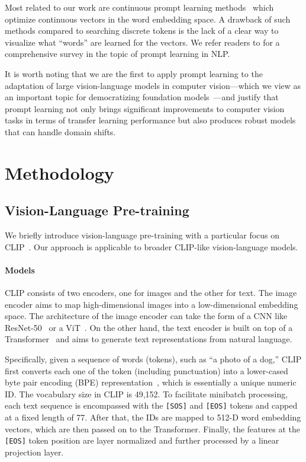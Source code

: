 Most related to our work are continuous prompt learning methods~\citep{zhong2021factual,li2021prefix,lester2021power} which optimize continuous vectors in the word embedding space. A drawback of such methods compared to searching discrete tokens is the lack of a clear way to visualize what ``words'' are learned for the vectors. We refer readers to \citet{liu2021pre} for a comprehensive survey in the topic of prompt learning in NLP.

It is worth noting that we are the first to apply prompt learning to the adaptation of large vision-language models in computer vision---which we view as an important topic for democratizing foundation models~\citep{bommasani2021opportunities}---and justify that prompt learning not only brings significant improvements to computer vision tasks in terms of transfer learning performance but also produces robust models that can handle domain shifts.


\section{Methodology} \label{sec:method}

\subsection{Vision-Language Pre-training}
We briefly introduce vision-language pre-training with a particular focus on CLIP~\citep{radford2021learning}. Our approach is applicable to broader CLIP-like vision-language models.

\paragraph{Models}
CLIP consists of two encoders, one for images and the other for text. The image encoder aims to map high-dimensional images into a low-dimensional embedding space. The architecture of the image encoder can take the form of a CNN like ResNet-50~\citep{he2016deep} or a ViT~\citep{dosovitskiy2021image}. On the other hand, the text encoder is built on top of a Transformer~\citep{vaswani2017attention} and aims to generate text representations from natural language.

Specifically, given a sequence of words (tokens), such as ``a photo of a dog,'' CLIP first converts each one of the token (including punctuation) into a lower-cased byte pair encoding (BPE) representation~\citep{sennrich2016neural}, which is essentially a unique numeric ID. The vocabulary size in CLIP is 49,152. To facilitate minibatch processing, each text sequence is encompassed with the \texttt{[SOS]} and \texttt{[EOS]} tokens and capped at a fixed length of 77. After that, the IDs are mapped to 512-D word embedding vectors, which are then passed on to the Transformer. Finally, the features at the \texttt{[EOS]} token position are layer normalized and further processed by a linear projection layer.

